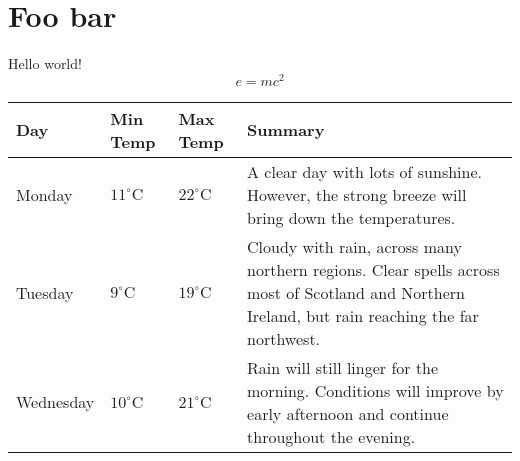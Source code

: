 \documentclass[table,color,cover]{fithesis/fithesis3}
\begin{document}
  \chapter{Foo bar}
  Hello world!
  \begin{equation}
    \tag{Mass--energy equivalence} e=mc^2
  \end{equation}
  \begin{center}
    \begin{tabularx}{\textwidth}{lllX}
    \toprule
    Day & Min Temp & Max Temp & Summary \\
    \midrule
    Monday & $11^{\circ}\mathrm{C}$ & $22^\circ\mathrm{C}$ & A
    clear day with lots of sunshine. However, the strong breeze
    will bring down the temperatures. \\
    Tuesday & $9^{\circ}\mathrm{C}$ & $19^\circ\mathrm{C}$ & Cloudy
    with rain, across many northern regions. Clear spells across
    most of Scotland and Northern Ireland, but rain reaching the
    far northwest. \\
    Wednesday & $10^{\circ}\mathrm{C}$ &
    $21^\circ\mathrm{C}$ & Rain will still linger for the morning.
    Conditions will improve by early afternoon and continue
    throughout the evening.\\
    \bottomrule
    \end{tabularx}
  \end{center}
\end{document}
